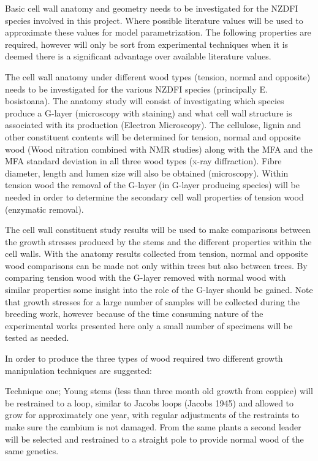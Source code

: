 \documentclass{article}
\begin{document}
Basic cell wall anatomy and geometry needs to be investigated for the NZDFI
species involved in this project. Where possible literature values will be used
to approximate these values for model parametrization. The following properties
are required, however will only be sort from experimental techniques when it is
deemed there is a significant advantage over available literature values.

The cell wall anatomy under different wood types (tension, normal and opposite)
needs to be investigated for the various NZDFI species (principally E.
bosistoana).
The anatomy study will consist of investigating which species produce a G-layer
(microscopy with staining) and what cell wall structure is associated with its
production (Electron Microscopy). The cellulose, lignin and other constituent
contents will be determined for tension, normal and opposite wood (Wood
nitration combined with NMR studies) along with the MFA and the MFA standard
deviation in all three wood types (x-ray diffraction). Fibre diameter, length
and lumen size will also be obtained (microscopy). Within tension wood the
removal of the G-layer (in G-layer producing species) will be needed in order to
determine the secondary cell wall properties of tension wood (enzymatic removal).

The cell wall constituent study results will be used to make comparisons between
the growth stresses produced by the stems and the different properties within
the cell walls. With the anatomy results collected from tension, normal and
opposite wood comparisons can be made not only within trees but
also between trees. By comparing tension wood with the G-layer removed with
normal wood with similar properties some insight into the role of the G-layer
should be gained. Note that growth stresses for a large number of samples will
be collected during the breeding work, however because of the time consuming
nature of the experimental works presented here only a small number of specimens
will be tested as needed.

In order to produce the three types of wood required two different growth
manipulation techniques are suggested:

Technique one; Young stems (less than three month old growth from coppice) will
be restrained to a loop, similar to Jacobs loops (Jacobs 1945) and allowed to
grow for approximately one year, with regular adjustments of the restraints to make sure
the cambium is not damaged. From the same plants a second leader will
be selected and restrained to a straight pole to provide normal wood of the same
genetics.
\end{document}

